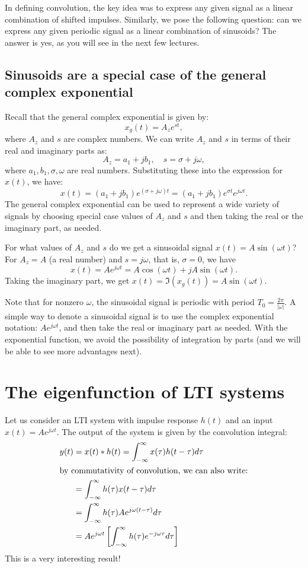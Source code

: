In defining convolution, the key idea was to express any given signal as a linear combination of shifted impulses. Similarly, we pose the following question: can we express any given periodic signal as a linear combination of sinusoids? The answer is yes, as you will see in the next few lectures.

\subsection{Sinusoids are a special case of the general complex exponential}
Recall that the general complex exponential is given by:
\[
x_g(t) = A_z e^{st},
\]
where \(A_z\) and \(s\) are complex numbers. We can write \(A_z\) and \(s\) in terms of their real and imaginary parts as:
\[
A_z = a_1 + j b_1, \quad s = \sigma + j\omega,
\]
where \(a_1, b_1, \sigma, \omega\) are real numbers. Substituting these into the expression for \(x(t)\), we have:
\[
x(t) = (a_1 + j b_1) e^{(\sigma + j\omega)t} = (a_1 + j b_1) e^{\sigma t} e^{j\omega t}.
\]
The general complex exponential can be used to represent a wide variety of signals by choosing special case values of \(A_z\) and \(s\) and then taking the real or the imaginary part, as needed.

\begin{popquiz}
  For what values of \(A_z\) and \(s\) do we get a sinusoidal signal $x(t) = A\sin(\omega t)$?
  \popqsplit
  For $A_z = A$ (a real number) and $s = j\omega$, that is, $\sigma = 0$, we have
  \[
  x(t) = A e^{j\omega t} = A \cos(\omega t) + j A \sin(\omega t).
  \]
  Taking the imaginary part, we get $x(t) = \Im(x_g(t)) = A \sin(\omega t)$.
\end{popquiz}
Note that for nonzero \(\omega\), the sinusoidal signal is periodic with period \(T_0 = \frac{2\pi}{|\omega|}\). A simple way to denote a sinusoidal signal is to use the complex exponential notation: $A e^{j\omega t}$, and then take the real or imaginary part as needed. With the exponential function, we avoid the possibility of integration by parts (and we will be able to see more advantages next).

\section{The eigenfunction of LTI systems}
Let us consider an LTI system with impulse response \(h(t)\) and an input $x(t) = Ae^{j\omega t}$. The output of the system is given by the convolution integral:
\begin{align*}
y(t) &= x(t) * h(t) = \int_{-\infty}^{\infty} x(\tau) h(t - \tau) d\tau \\
\intertext{by commutativity of convolution, we can also write:}
&= \int_{-\infty}^{\infty} h(\tau) x(t - \tau) d\tau \\
&= \int_{-\infty}^{\infty} h(\tau) A e^{j\omega (t - \tau)} d\tau \\
&= A e^{j\omega t} \left[\int_{-\infty}^{\infty} h(\tau) e^{-j\omega \tau} d\tau\right]
\end{align*}
This is a very interesting result!

